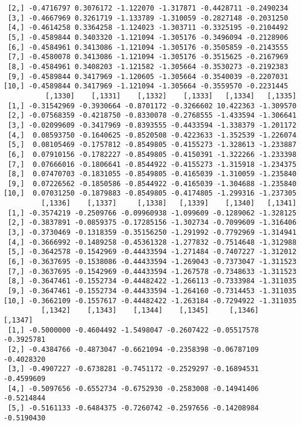 \documentclass[
  letterpaper,
  DIV=11,
  numbers=noendperiod]{scrreprt}
\begin{document}
\begin{verbatim}
 [2,] -0.4716797 0.3076172 -1.122070 -1.317871 -0.4428711 -0.2490234
 [3,] -0.4667969 0.3261719 -1.133789 -1.310059 -0.2827148 -0.2031250
 [4,] -0.4614258 0.3364258 -1.124023 -1.303711 -0.3325195 -0.2104492
 [5,] -0.4589844 0.3403320 -1.121094 -1.305176 -0.3496094 -0.2128906
 [6,] -0.4584961 0.3413086 -1.121094 -1.305176 -0.3505859 -0.2143555
 [7,] -0.4580078 0.3413086 -1.121094 -1.305176 -0.3515625 -0.2167969
 [8,] -0.4584961 0.3408203 -1.121582 -1.305664 -0.3530273 -0.2192383
 [9,] -0.4589844 0.3417969 -1.120605 -1.305664 -0.3540039 -0.2207031
[10,] -0.4589844 0.3417969 -1.121094 -1.305664 -0.3559570 -0.2231445
          [,1330]    [,1331]    [,1332]    [,1333]   [,1334]   [,1335]
 [1,] -0.31542969 -0.3930664 -0.8701172 -0.3266602 10.422363 -1.309570
 [2,] -0.07568359 -0.4218750 -0.8330078 -0.2768555 -1.433594 -1.306641
 [3,] -0.02099609 -0.3417969 -0.8393555 -0.4433594 -1.338379 -1.201172
 [4,]  0.08593750 -0.1640625 -0.8520508 -0.4223633 -1.352539 -1.226074
 [5,]  0.08105469 -0.1757812 -0.8549805 -0.4155273 -1.328613 -1.233887
 [6,]  0.07910156 -0.1782227 -0.8549805 -0.4150391 -1.322266 -1.233398
 [7,]  0.07666016 -0.1806641 -0.8544922 -0.4155273 -1.315918 -1.234375
 [8,]  0.07470703 -0.1831055 -0.8549805 -0.4165039 -1.310059 -1.235840
 [9,]  0.07226562 -0.1850586 -0.8544922 -0.4165039 -1.304688 -1.235840
[10,]  0.07031250 -0.1879883 -0.8549805 -0.4174805 -1.299316 -1.237305
         [,1336]    [,1337]     [,1338]   [,1339]    [,1340]   [,1341]
 [1,] -0.3574219 -0.2509766 -0.09960938 -1.099609 -0.1289062 -1.328125
 [2,] -0.3837891 -0.0859375 -0.17285156 -1.302734 -0.7099609 -1.316406
 [3,] -0.3730469 -0.1318359 -0.35156250 -1.291992 -0.7792969 -1.314941
 [4,] -0.3666992 -0.1489258 -0.45361328 -1.277832 -0.7514648 -1.312988
 [5,] -0.3642578 -0.1542969 -0.44433594 -1.271484 -0.7407227 -1.312012
 [6,] -0.3637695 -0.1538086 -0.44433594 -1.269043 -0.7373047 -1.311523
 [7,] -0.3637695 -0.1542969 -0.44433594 -1.267578 -0.7348633 -1.311523
 [8,] -0.3647461 -0.1552734 -0.44482422 -1.266113 -0.7333984 -1.311035
 [9,] -0.3647461 -0.1552734 -0.44433594 -1.264160 -0.7314453 -1.311035
[10,] -0.3662109 -0.1557617 -0.44482422 -1.263184 -0.7294922 -1.311035
         [,1342]    [,1343]    [,1344]    [,1345]     [,1346]    [,1347]
 [1,] -0.5000000 -0.4604492 -1.5498047 -0.2607422 -0.05517578 -0.3925781
 [2,] -0.4384766 -0.4873047 -0.6621094 -0.2358398 -0.06787109 -0.4028320
 [3,] -0.4907227 -0.6738281 -0.7451172 -0.2529297 -0.16894531 -0.4599609
 [4,] -0.5097656 -0.6552734 -0.6752930 -0.2583008 -0.14941406 -0.5214844
 [5,] -0.5161133 -0.6484375 -0.7260742 -0.2597656 -0.14208984 -0.5190430

\end{verbatim}
\end{document}
